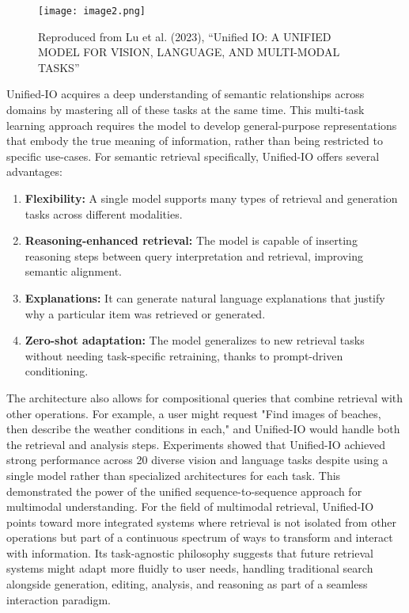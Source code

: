 \documentclass[conference]{IEEEtran}
\begin{document}
\begin{enumerate}
\begin{figure}
    \centering
    \texttt{[image: image2.png]}
    \caption{Reproduced from Lu et al. (2023), “Unified IO: A UNIFIED MODEL FOR VISION, LANGUAGE, AND MULTI-MODAL TASKS”}
    \label{fig:enter-label}
\end{figure}

Unified-IO acquires a deep understanding of semantic relationships across domains by mastering all of these tasks at the same time. This multi-task learning approach requires the model to develop general-purpose representations that embody the true meaning of information, rather than being restricted to specific use-cases.
For semantic retrieval specifically, Unified-IO offers several advantages:

\begin{enumerate}
    \item \textbf{Flexibility:} A single model supports many types of retrieval and generation tasks across different modalities.
    
    \item \textbf{Reasoning-enhanced retrieval:} The model is capable of inserting reasoning steps between query interpretation and retrieval, improving semantic alignment.
    
    \item \textbf{Explanations:} It can generate natural language explanations that justify why a particular item was retrieved or generated.
    
    \item \textbf{Zero-shot adaptation:} The model generalizes to new retrieval tasks without needing task-specific retraining, thanks to prompt-driven conditioning.
\end{enumerate}

The architecture also allows for compositional queries that combine retrieval with other operations. For example, a user might request "Find images of beaches, then describe the weather conditions in each," and Unified-IO would handle both the retrieval and analysis steps.
Experiments showed that Unified-IO achieved strong performance across 20 diverse vision and language tasks despite using a single model rather than specialized architectures for each task. This demonstrated the power of the unified sequence-to-sequence approach for multimodal understanding.
For the field of multimodal retrieval, Unified-IO points toward more integrated systems where retrieval is not isolated from other operations but part of a continuous spectrum of ways to transform and interact with information. Its task-agnostic philosophy suggests that future retrieval systems might adapt more fluidly to user needs, handling traditional search alongside generation, editing, analysis, and reasoning as part of a seamless interaction paradigm.


\end{enumerate}
\end{document}
